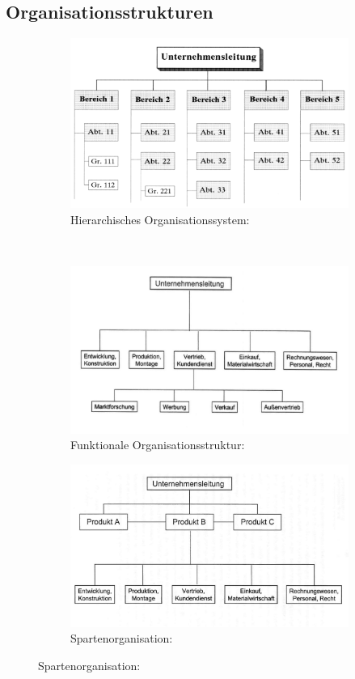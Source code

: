 \documentclass[11pt,a4paper]{article}
\begin{document}
\subsection{Organisationsstrukturen}

\begin{figure}[H]
	\centering
	\begin{subfigure}{0.45\textwidth}
		\caption*{Hierarchisches Organisationssystem:}
		\includegraphics[width=\textwidth]{hierarchisches}
	\end{subfigure}
	~
	\begin{subfigure}{0.45\textwidth}
		\caption*{Funktionale Organisationsstruktur:}
		\includegraphics[width=\textwidth]{funktionale}
	\end{subfigure}
	\par\bigskip
	\par\bigskip
	\begin{subfigure}{0.45\textwidth}
		\caption*{Spartenorganisation:}
		\includegraphics[width=\textwidth]{sparten}

\end{subfigure}
\end{figure}
\end{document}
